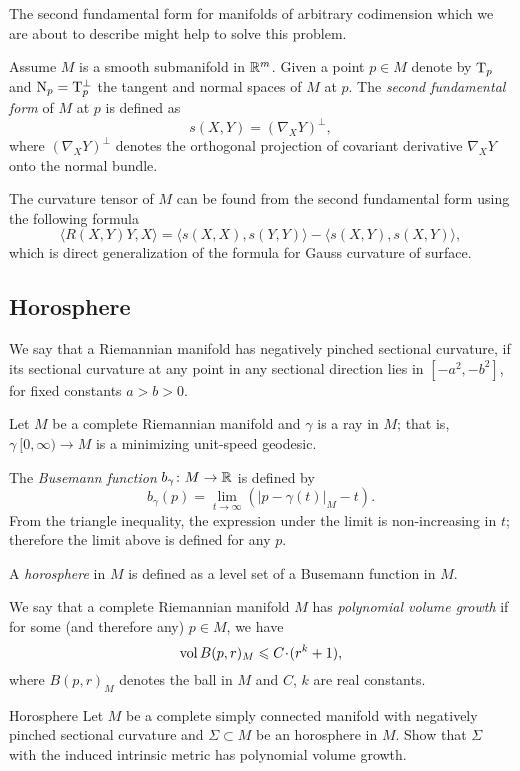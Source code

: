 The second fundamental form for manifolds of arbitrary codimension
which we are about to describe 
might help to solve this problem.

Assume $M$ is a smooth submanifold in $\mathbb{R}^m$.
Given a point $p\in M$ denote by $\mathrm{T}_p$ and $\mathrm{N}_p=\mathrm{T}_p^\bot$
the tangent and normal spaces of $M$ at $p$.
The \emph{second fundamental form}\label{page:second fundamental form} of $M$ at $p$ is defined as $$s(X,Y)=(\nabla_X Y)^\bot,$$ 
where $(\nabla_X Y)^\bot$ denotes the orthogonal projection of covariant derivative $\nabla_X Y$ onto the normal bundle.

The curvature tensor of $M$ can be found from the second fundamental form using the following  formula
\[\langle R(X,Y)Y,X\rangle=\langle s(X,X),s(Y,Y)\rangle-\langle s(X,Y),s(X,Y)\rangle,\]
which is direct generalization of the formula for Gauss curvature of surface.


\subsection*{Horosphere}

We say that a Riemannian manifold has negatively pinched sectional curvature, if its sectional curvature at any point in any sectional direction lies in  $[-a^2, -b^2]$, for fixed constants $a>b>0$.

Let $M$ be a complete Riemannian manifold
and $\gamma$ is a ray in $M$; 
that is, $\gamma\:[0, \infty)\to M$ is a minimizing unit-speed geodesic.

The \emph{Busemann function} $b_\gamma\colon M\to\mathbb{R}$ is defined by
$$b_\gamma(p)=\lim_{t\to\infty}\left(|p-\gamma(t)|_M-t\right).$$
From the triangle inequality, 
the expression under the limit is non-increasing in $t$; 
therefore  the limit above is defined for any $p$.

A \emph{horosphere} in $M$ is defined as a level set of a Busemann function
in $M$.

We say that a complete Riemannian manifold $M$ has \emph{polynomial volume growth} if for some (and therefore any) $p\in M$, 
we have 
$$\vol B(p,r)_M\z\le C\cdot (r^k+1),$$ 
where $B(p,r)_M$ denotes the ball in $M$ and  $C$, $k$ are real constants.

\begin{pr}{}{Horosphere}\label{Horosphere} Let $M$ be a complete simply connected manifold with negatively pin\-ched sectional curvature
and $\Sigma\subset M$ be an horosphere in $M$.
Show that
$\Sigma$ with the induced intrinsic metric 
has polynomial volume growth.
\end{pr}

